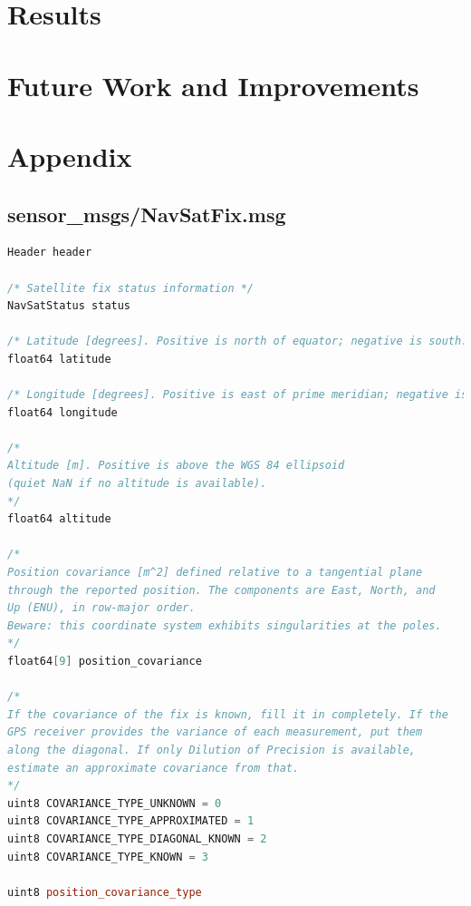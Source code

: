 \documentclass[titlepage,12pt,a4paper]{article}
\begin{document}
\pagebreak
\section{Results}

\pagebreak
\section{Future Work and Improvements}

\pagebreak
\section{Appendix}


\subsection{sensor\_msgs/NavSatFix.msg}
\begin{lstlisting}[language=C++]
Header header

/* Satellite fix status information */
NavSatStatus status

/* Latitude [degrees]. Positive is north of equator; negative is south. */
float64 latitude

/* Longitude [degrees]. Positive is east of prime meridian; negative is west. */
float64 longitude

/*
Altitude [m]. Positive is above the WGS 84 ellipsoid
(quiet NaN if no altitude is available).
*/
float64 altitude

/*
Position covariance [m^2] defined relative to a tangential plane
through the reported position. The components are East, North, and
Up (ENU), in row-major order.
Beware: this coordinate system exhibits singularities at the poles.
*/
float64[9] position_covariance

/*
If the covariance of the fix is known, fill it in completely. If the
GPS receiver provides the variance of each measurement, put them
along the diagonal. If only Dilution of Precision is available,
estimate an approximate covariance from that.
*/
uint8 COVARIANCE_TYPE_UNKNOWN = 0
uint8 COVARIANCE_TYPE_APPROXIMATED = 1
uint8 COVARIANCE_TYPE_DIAGONAL_KNOWN = 2
uint8 COVARIANCE_TYPE_KNOWN = 3

uint8 position_covariance_type
\end{lstlisting}
\end{document}
